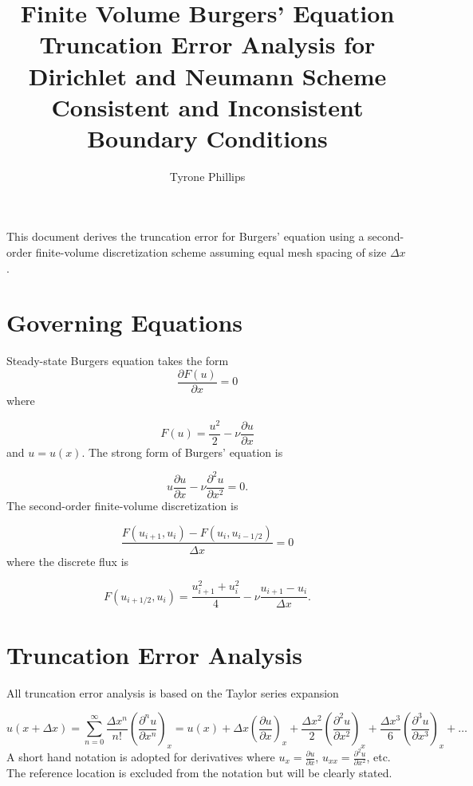 \documentclass[10pt]{article}%
\title{Finite Volume Burgers' Equation Truncation Error Analysis for Dirichlet and Neumann Scheme Consistent and Inconsistent Boundary Conditions}
\author{Tyrone Phillips}
\begin{document}
\maketitle

This document derives the truncation error for Burgers' equation using a second-order finite-volume discretization scheme assuming equal mesh spacing of size $\Delta x$.

\section{Governing Equations}
Steady-state Burgers equation takes the form
\begin{equation}
\frac{\partial F(u)}{\partial x} = 0
\end{equation}
where

\begin{equation}
F(u) = \frac{u^2}{2} - \nu \frac{\partial u}{\partial x} 
\label{eq:F}
\end{equation}
and $u=u(x)$. The strong form of Burgers' equation is

\begin{equation}
u\frac{\partial u}{\partial x} - \nu \frac{\partial^2 u}{\partial x^2} = 0.
\label{eq:L}
\end{equation}
The second-order finite-volume discretization is

\begin{equation}
\frac{F(u_{i+1}, u_i) - F(u_i,u_{i-1/2})}{\Delta x} = 0
\end{equation}
where the discrete flux is

\begin{equation}
F(u_{i+1/2}, u_i) = \frac{ u_{i+1}^2 + u_{i}^2}{4 } - \nu \frac{u_{i+1}-u_i}{\Delta x}.
\label{eq:Fh}
\end{equation}


\section{Truncation Error Analysis}


All truncation error analysis is based on the Taylor series expansion

\begin{equation}
  u(x+\Delta x) = \sum_{n=0}^\infty \frac{\Delta x^n}{n!} \left(\frac{\partial^n u}{\partial x^n}\right)_{x} = u(x) + \Delta x \left( \frac{\partial u}{\partial x}\right)_x + \frac{\Delta x^2}{2} \left(\frac{\partial^2 u}{\partial x^2}\right)_x + \frac{\Delta x^3}{6} \left( \frac{\partial^3 u}{\partial x^3}\right)_x + \dots
\end{equation}
A short hand notation is adopted for derivatives where $u_x=\frac{\partial u}{\partial x}$, $u_{xx} = \frac{\partial^2 u}{\partial x^2}$, etc. The reference location is excluded from the notation but will be clearly stated.
\end{document}
